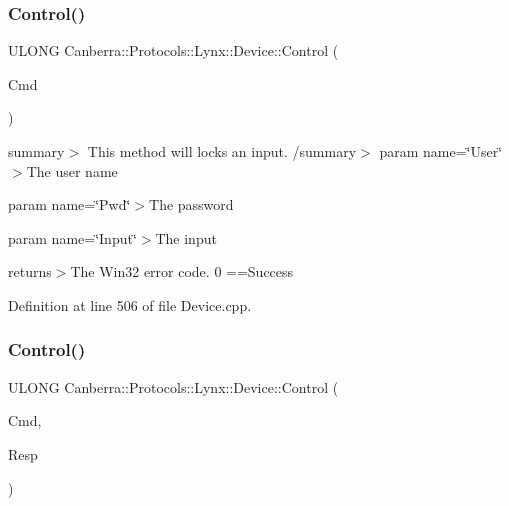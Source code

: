 \subsubsection{\texorpdfstring{Control()}{Control()}\hspace{0.1cm}{\footnotesize\ttfamily [1/4]}}
{\footnotesize\ttfamily U\+L\+O\+NG Canberra\+::\+Protocols\+::\+Lynx\+::\+Device\+::\+Control (\begin{DoxyParamCaption}\item[{\hyperlink{class_canberra_1_1_data_types_1_1_application_1_1_command_data}{Canberra\+::\+Data\+Types\+::\+Application\+::\+Command\+Data} \&}]{Cmd }\end{DoxyParamCaption})\hspace{0.3cm}{\ttfamily [protected]}}

summary$>$ This method will locks an input. /summary$>$ param name=\char`\"{}\+User\char`\"{}$>$The user name

param name=\char`\"{}\+Pwd\char`\"{}$>$The password

param name=\char`\"{}\+Input\char`\"{}$>$The input

returns$>$The Win32 error code. 0 ==Success

Definition at line 506 of file Device.\+cpp.

\mbox{\label{class_canberra_1_1_protocols_1_1_lynx_1_1_device_a6232b1dc722fb8f11248e19ddd1f1f47_a6232b1dc722fb8f11248e19ddd1f1f47}} 
\subsubsection{\texorpdfstring{Control()}{Control()}\hspace{0.1cm}{\footnotesize\ttfamily [2/4]}}
{\footnotesize\ttfamily U\+L\+O\+NG Canberra\+::\+Protocols\+::\+Lynx\+::\+Device\+::\+Control (\begin{DoxyParamCaption}\item[{\hyperlink{class_canberra_1_1_data_types_1_1_application_1_1_command_data}{Canberra\+::\+Data\+Types\+::\+Application\+::\+Command\+Data} \&}]{Cmd,  }\item[{\hyperlink{class_canberra_1_1_data_types_1_1_application_1_1_command_data}{Canberra\+::\+Data\+Types\+::\+Application\+::\+Command\+Data} $\ast$$\ast$}]{Resp }\end{DoxyParamCaption})\hspace{0.3cm}{\ttfamily [protected]}}

